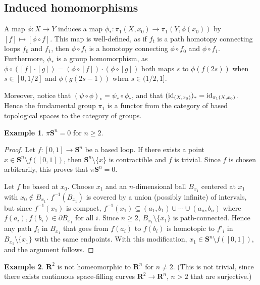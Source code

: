 \documentclass[11pt]{article}
\theoremstyle{definition}
\newtheorem*{example}{Example}
\theoremstyle{plain}
\theoremstyle{remark}
\newcommand{\id}{\textup{id}}
\newcommand{\R}{\mathbf{R}}
\begin{document}
\subsection{Induced homomorphisms}\label{6}

A map $\phi:X\to Y$ induces a map $\phi_\ast:\pi_1(X,x_0)\to\pi_1(Y,\phi(x_0))$ by $[f]\mapsto[\phi\circ f]$. This map is well-defined, as if $f_t$ is a path homotopy connecting loops $f_0$ and $f_1$, then $\phi\circ f_t$ is a homotopy connecting $\phi\circ f_0$ and $\phi\circ f_1$. Furthermore, $\phi_\ast$ is a group homomorphism, as $\phi\circ([f]\cdot[g])=(\phi\circ[f])\cdot(\phi\circ[g])$ both maps $s$ to $\phi(f(2s))$ when $s\in[0,1/2]$ and $\phi(g(2s-1))$ when $s\in(1/2,1]$.\medbreak

Moreover, notice that $(\psi\circ\phi)_\ast=\psi_\ast\circ\phi_\ast$, and that $(\id_{(X,x_0)})_\ast=\id_{\pi_1(X,x_0)}$. Hence the fundamental group $\pi_1$ is a functor from the category of based topological spaces to the category of groups.

\begin{example}
$\pi\mathbf{S}^n=0$ for $n\geq2$.
\begin{proof}
Let $f:[0,1]\to\mathbf{S}^n$ be a based loop. If there exists a point $x\in\mathbf{S}^n\setminus f([0,1])$, then $\mathbf{S}^n\setminus\{x\}$ is contractible and $f$ is trivial. Since $f$ is chosen arbitrarily, this proves that $\pi\mathbf{S}^n=0$.\medbreak

Let $f$ be based at $x_0$. Choose $x_1$ and an $n$-dimensional ball $B_{x_1}$ centered at $x_1$ with $x_0\not\in B_{x_1}$. $f^{-1}(B_{x_1})$ is covered by a union (possibly infinite) of intervals, but since $f^{-1}(x_1)$ is compact, $f^{-1}(x_1)\subseteq(a_1,b_1)\cup\cdots\cup(a_n,b_n)$ where $f(a_i),f(b_i)\in\partial B_{x_1}$ for all $i$. Since $n\geq2$, $B_{x_1}\setminus\{x_1\}$ is path-connected. Hence any path $f_i$ in $B_{x_1}$ that goes from $f(a_i)$ to $f(b_i)$ is homotopic to $f'_i$ in $B_{x_1}\setminus\{x_1\}$ with the same endpoints. With this modification, $x_1\in\mathbf{S}^n\setminus f([0,1])$, and the argument follows.
\end{proof}
\end{example}


\begin{example}
$\R^2$ is not homeomorphic to $\R^n$ for $n\neq2$. (This is not trivial, since there exists continuous space-filling curves $\R^2\to\R^n$, $n>2$ that are surjective.)
\end{example}
\end{document}
